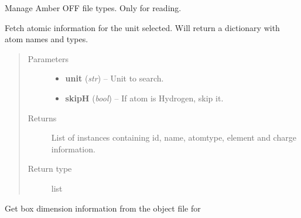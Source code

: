 \documentclass[letterpaper,10pt,english]{sphinxmanual}
\begin{document}
\begin{fulllineitems}
\label{OFFManager:pyMDMix.OFFManager.OFFManager}
Manage Amber OFF file types. Only for reading.

\begin{fulllineitems}
\label{OFFManager:pyMDMix.OFFManager.OFFManager.getAtoms}
Fetch atomic information for the unit selected.
Will return a dictionary with atom names and types.
\begin{quote}\begin{description}
\item[{Parameters}] \leavevmode\begin{itemize}
\item {} 
\textbf{unit} (\emph{str}) -- Unit to search.

\item {} 
\textbf{skipH} (\emph{bool}) -- If atom is Hydrogen, skip it.

\end{itemize}

\item[{Returns}] \leavevmode
List of {\hyperref[containers:pyMDMix.containers.Atom]{}} instances containing id, name, atomtype, element and charge information.

\item[{Return type}] \leavevmode
list

\end{description}\end{quote}

\end{fulllineitems}


\begin{fulllineitems}
\label{OFFManager:pyMDMix.OFFManager.OFFManager.getBoxDimensions}
Get box dimension information from the object file for 

\end{fulllineitems}



\end{fulllineitems}
\end{document}
